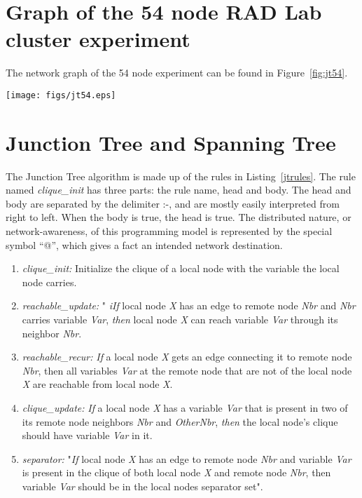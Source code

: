 \section{Graph of the 54 node RAD Lab cluster experiment}

The network graph of the 54 node experiment can be found in Figure~\ref{fig:jt54}.

\begin{sidewaysfigure}[tpb]
 \centering
 \texttt{[image: figs/jt54.eps]}
 \caption{Network graph of 54 node Intel-Berkeley dataset being run on the RAD Lab cluster.}
 \label{fig:jt54}
\end{sidewaysfigure}

\section{Junction Tree and Spanning Tree}


The Junction Tree algorithm is made up of the rules in Listing~\ref{jtrules}.
The rule named \textit{clique\_init} has three parts: the rule name, head and body. The head and body are separated 
by the delimiter :-, and are mostly easily interpreted from right to left. When the body is true, the head is 
true. The distributed nature, or network-awareness, of this programming model is represented by the special 
symbol “@”, which gives a fact an intended network destination. 

\begin{enumerate}
\item {\textit{clique\_init:}} Initialize the clique of a local node with the
variable the local node carries.
\item{\textit{reachable\_update:}} " \textit{iIf} local node \textit{X} has an
edge to remote node \textit{Nbr} and \textit{Nbr} carries variable
\textit{Var}, \emph{then} local node \textit{X} can reach variable
\textit{Var} through its neighbor \textit{Nbr}.
\item{\textit{reachable\_recur:}} \textit{If} a local node \textit{X} gets an
edge connecting it to remote node \textit{Nbr}, then all variables
\textit{Var} at the remote node that are not of the local node \textit{X} are
reachable from local node \textit{X}.
\item{\textit{clique\_update:}} \textit{If} a local node \textit{X} has a
variable \textit{Var} that is present in two of its remote node neighbors
\textit{Nbr} and \textit{OtherNbr}, \textit{then} the local node's clique
should have variable \textit{Var} in it.
\item {\textit{separator:}} "\textit{If} local node \textit{X} has an edge to
remote node \textit{Nbr} and variable \textit{Var} is present in the clique of
both local node \textit{X} and remote node \textit{Nbr}, then variable
\textit{Var} should be in the local nodes separator set".
\end{enumerate}

